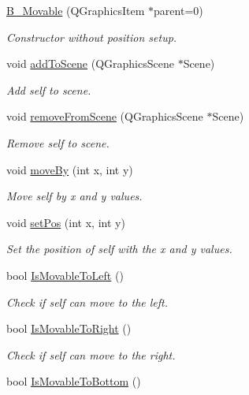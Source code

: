 \begin{DoxyCompactItemize}
\hyperlink{class_b___movable_aef88fa8933731c08731796a9ee3fda6b}{B\+\_\+\+Movable} (Q\+Graphics\+Item $\ast$parent=0)
\begin{DoxyCompactList}\small\item\em Constructor without position setup. \end{DoxyCompactList}\item 
void \hyperlink{class_b___movable_a8a23ac4b1692d95607dcccd6d6c9a973}{add\+To\+Scene} (Q\+Graphics\+Scene $\ast$Scene)
\begin{DoxyCompactList}\small\item\em Add self to scene. \end{DoxyCompactList}\item 
void \hyperlink{class_b___movable_aa4d26e877655021ef70bc6914fe04418}{remove\+From\+Scene} (Q\+Graphics\+Scene $\ast$Scene)
\begin{DoxyCompactList}\small\item\em Remove self to scene. \end{DoxyCompactList}\item 
void \hyperlink{class_b___movable_a55fb8069fc55c4edabd2ac076acdee17}{move\+By} (int x, int y)
\begin{DoxyCompactList}\small\item\em Move self by x and y values. \end{DoxyCompactList}\item 
void \hyperlink{class_b___movable_aca717ec608426940422f1bc658201bf5}{set\+Pos} (int x, int y)
\begin{DoxyCompactList}\small\item\em Set the position of self with the x and y values. \end{DoxyCompactList}\item 
bool \hyperlink{class_b___movable_a96a0a18c27314600a19d467b6f7820a3}{Is\+Movable\+To\+Left} ()
\begin{DoxyCompactList}\small\item\em Check if self can move to the left. \end{DoxyCompactList}\item 
bool \hyperlink{class_b___movable_a134b648413c6d27c008f8a0655ffa0f9}{Is\+Movable\+To\+Right} ()
\begin{DoxyCompactList}\small\item\em Check if self can move to the right. \end{DoxyCompactList}\item 
bool \hyperlink{class_b___movable_a190fdc076141ae6698334bfe4dfd61a3}{Is\+Movable\+To\+Bottom} ()

\end{DoxyCompactItemize}
